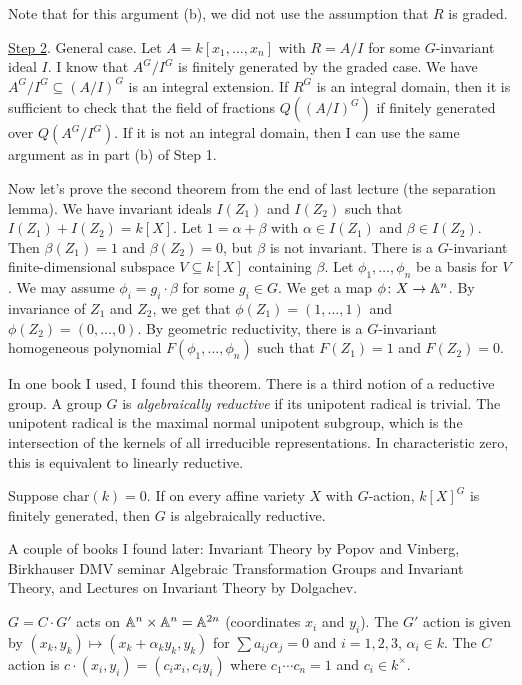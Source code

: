 Note that for this argument (b), we did not use the assumption that $R$ is graded.

\underline{Step 2}. General case. Let $A=k[x_1,\dots, x_n]$ with $R=A/I$ for some $G$-invariant ideal $I$. I know that $A^G/I^G$ is finitely generated by the graded case. We have $A^G/I^G\subseteq (A/I)^G$ is an integral extension. If $R^G$ is an integral domain, then it is sufficient to check that the field of fractions $Q((A/I)^G)$ if finitely generated over $Q(A^G/I^G)$. If it is not an integral domain, then I can use the same argument as in part (b) of Step 1.

\bigskip

Now let's prove the second theorem from the end of last lecture (the separation lemma). We have invariant ideals $I(Z_1)$ and $I(Z_2)$ such that $I(Z_1)+I(Z_2)=k[X]$. Let $1=\alpha+\beta$ with $\alpha\in I(Z_1)$ and $\beta\in I(Z_2)$. Then $\beta(Z_1)=1$ and $\beta(Z_2)=0$, but $\beta$ is not invariant. There is a $G$-invariant finite-dimensional subspace $V\subseteq k[X]$ containing $\beta$. Let $\phi_1,\dots,\phi_n$ be a basis for $V$. We may assume $\phi_i=g_i\cdot\beta$ for some $g_i\in G$. We get a map $\phi\colon X\to \AA^n$. By invariance of $Z_1$ and $Z_2$, we get that $\phi(Z_1)=(1,\dots, 1)$ and $\phi(Z_2)=(0,\dots, 0)$. By geometric reductivity, there is a $G$-invariant homogeneous polynomial $F(\phi_1,\dots, \phi_n)$ such that $F(Z_1)=1$ and $F(Z_2)=0$.

\bigskip

In one book I used, I found this theorem. There is a third notion of a reductive group. A group $G$ is \emph{algebraically reductive} if its unipotent radical is trivial. The unipotent radical is the maximal normal unipotent subgroup, which is the intersection of the kernels of all irreducible representations. In characteristic zero, this is equivalent to linearly reductive.
\begin{theorem}[Popov]
 Suppose $\mathrm{char}(k)=0$. If on every affine variety $X$ with $G$-action, $k[X]^G$ is finitely generated, then $G$ is algebraically reductive.
\end{theorem}
A couple of books I found later: Invariant Theory by Popov and Vinberg, Birkhauser DMV seminar Algebraic Transformation Groups and Invariant Theory, and Lectures on Invariant Theory by Dolgachev.


$G=C\cdot G'$ acts on $\AA^n\times \AA^n=\AA^{2n}$ (coordinates $x_i$ and $y_i$). The $G'$ action is given by $(x_k,y_k)\mapsto (x_k+\alpha_ky_k,y_k)$ for $\sum a_{ij}\alpha_j=0$ and $i=1,2,3$, $\alpha_i\in k$. The $C$ action is $c\cdot (x_i,y_i)=(c_ix_i,c_iy_i)$ where $c_1\cdots c_n=1$ and $c_i\in k^\times$.

